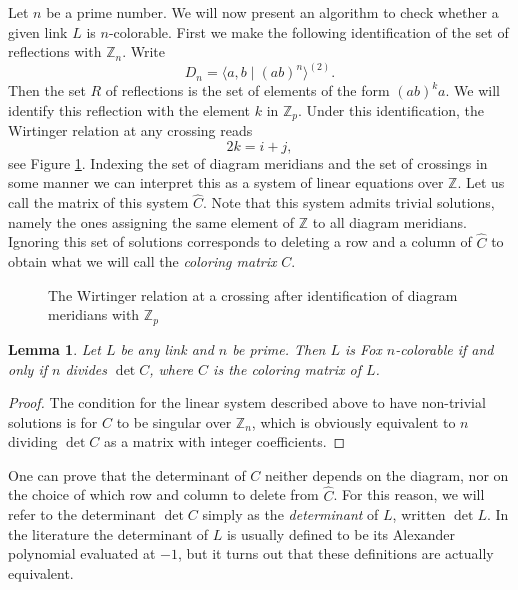 \documentclass{article}
\newtheorem{lemma}[theorem]{Lemma}
\theoremstyle{definition}
\begin{document}
Let $n$ be a prime number. We will now present an algorithm to check whether a given link $L$ is $n$-colorable. First we make the following identification of the set of reflections with $\mathbb{Z}_n$. Write $$D_n = \langle a, b \; | \; (ab)^n \rangle^{(2)}.$$ Then the set $R$ of reflections is the set of elements of the form $(ab)^ka$. We will identify this reflection with the element $k$ in $\mathbb{Z}_p$.
Under this identification, the Wirtinger relation at any crossing reads $$2k = i + j,$$ see Figure \ref{fig:wirtinger-dihedral}. Indexing the set of diagram meridians and the set of crossings in some manner we can interpret this as a system of linear equations over $\mathbb{Z}$. Let us call the matrix of this system $\widehat{C}$. Note that this system admits trivial solutions, namely the ones assigning the same element of $\mathbb{Z}$ to all diagram meridians. Ignoring this set of solutions corresponds to deleting a row and a column of $\widehat{C}$ to obtain what we will call the \textit{coloring matrix} $C$.

\begin{figure}[ht]
\centering
{}
\caption{The Wirtinger relation at a crossing after identification of diagram meridians with $\mathbb{Z}_p$}
\label{fig:wirtinger-dihedral}
\end{figure}


\begin{lemma}
Let $L$ be any link and $n$ be prime. Then $L$ is Fox $n$-colorable if and only if $n$ divides $\det C$, where $C$ is the coloring matrix of $L$.
\end{lemma}

\begin{proof}
The condition for the linear system described above to have non-trivial solutions is for $C$ to be singular over $\mathbb{Z}_n$, which is obviously equivalent to $n$ dividing $\det C$ as a matrix with integer coefficients.
\end{proof}

One can prove that the determinant of $C$ neither depends on the diagram, nor on the choice of which row and column to delete from $\widehat{C}$. For this reason, we will refer to the determinant $\det C$ simply as the \textit{determinant} of $L$, written $\det L$. In the literature the determinant of $L$ is usually defined to be its Alexander polynomial evaluated at $-1$, but it turns out that these definitions are actually equivalent. %
\end{document}
